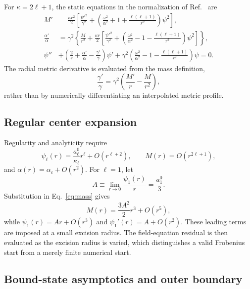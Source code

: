 \documentclass[aps,prd,preprint,onecolumn,nofootinbib,superscriptaddress,showkeys]{revtex4-2}
\begin{document}
For $\kappa=2\ell+1$, the static equations in the normalization of Ref.~\cite{Alcubierre2021} are
\begin{align}
M'&=\frac{\kappa r^{2}}{2}\left[\frac{\psi'^{2}}{\gamma^{2}}+
\left(\frac{\omega^{2}}{\alpha^{2}}+1+\frac{\ell(\ell+1)}{r^{2}}\right)\psi^{2}\right],
\label{eq:mass}\\
\frac{\alpha'}{\alpha}&=\gamma^{2}\left\{\frac{M}{r^{2}}+
\frac{\kappa r}{2}\left[\frac{\psi'^{2}}{\gamma^{2}}+
\left(\frac{\omega^{2}}{\alpha^{2}}-1-\frac{\ell(\ell+1)}{r^{2}}\right)\psi^{2}\right]\right\},
\label{eq:lapse}\\
\psi''&+\left(\frac{2}{r}+\frac{\alpha'}{\alpha}-\frac{\gamma'}{\gamma}\right)\psi'
+\gamma^{2}\left(\frac{\omega^{2}}{\alpha^{2}}-1-\frac{\ell(\ell+1)}{r^{2}}\right)\psi=0.
\label{eq:kg}
\end{align}
The radial metric derivative is evaluated from the mass definition,
\begin{equation}
\frac{\gamma'}{\gamma}
=\gamma^{2}\left(\frac{M'}{r}-\frac{M}{r^{2}}\right),
\label{eq:loggamma}
\end{equation}
rather than by numerically differentiating an interpolated metric profile.

\subsection{Regular center expansion}

Regularity and analyticity require
\begin{equation}
\psi_{\ell}(r)=\frac{a_{\ell}^{0}}{\kappa_{\ell}}r^{\ell}+O(r^{\ell+2}),
\qquad M(r)=O(r^{2\ell+1}),
\label{eq:centerbackground}
\end{equation}
and $\alpha(r)=\alpha_{c}+O(r^{2})$. For $\ell=1$, let
\begin{equation}
A\equiv\lim_{r\to0}\frac{\psi_{1}(r)}{r}=\frac{a_{1}^{0}}{3}.
\label{eq:center-amplitude}
\end{equation}
Substitution in Eq.~\eqref{eq:mass} gives
\begin{equation}
M(r)=\frac{3A^{2}}{2}r^{3}+O(r^{5}),
\label{eq:center-mass}
\end{equation}
while $\psi_{1}(r)=Ar+O(r^{3})$ and $\psi_{1}'(r)=A+O(r^{2})$. These leading terms are imposed at a small excision radius. The field-equation residual is then evaluated as the excision radius is varied, which distinguishes a valid Frobenius start from a merely finite numerical start.

\subsection{Bound-state asymptotics and outer boundary}
\end{document}
